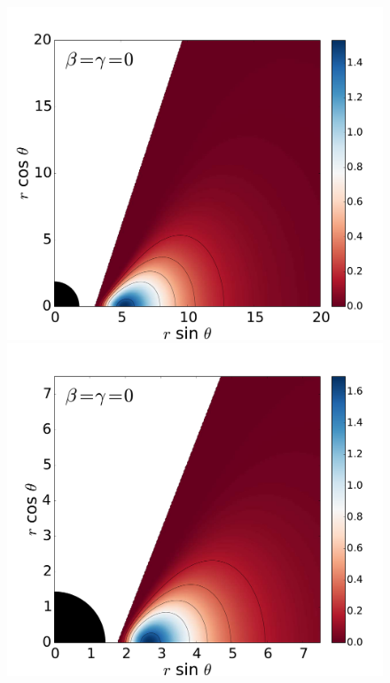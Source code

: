 \documentclass[]{aa}
\begin{document}
\begin{figure}
\centering
\includegraphics[scale=0.14]{figures/fig2_1_1.pdf}
\hspace{-0.3cm}
\includegraphics[scale=0.14]{figures/fig2_1_2.pdf}
\hspace{-0.2cm}

\end{figure}
\end{document}
